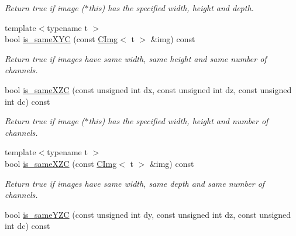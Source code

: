 \begin{DoxyCompactItemize}
\begin{DoxyCompactList}\small\item\em Return {\ttfamily true} if image ($\ast$this) has the specified width, height and depth. \item\end{DoxyCompactList}\item 
\hypertarget{structcimg__library_1_1CImg_a5468ee115db0e739ea554f5747e7ad16}{
{\footnotesize template$<$typename t $>$ }\\bool \hyperlink{structcimg__library_1_1CImg_a5468ee115db0e739ea554f5747e7ad16}{is\_\-sameXYC} (const \hyperlink{structcimg__library_1_1CImg}{CImg}$<$ t $>$ \&img) const }
\label{structcimg__library_1_1CImg_a5468ee115db0e739ea554f5747e7ad16}

\begin{DoxyCompactList}\small\item\em Return {\ttfamily true} if images have same width, same height and same number of channels. \item\end{DoxyCompactList}\item 
\hypertarget{structcimg__library_1_1CImg_afc24993d2887722e034d3362a6915b38}{
bool \hyperlink{structcimg__library_1_1CImg_afc24993d2887722e034d3362a6915b38}{is\_\-sameXZC} (const unsigned int dx, const unsigned int dz, const unsigned int dc) const }
\label{structcimg__library_1_1CImg_afc24993d2887722e034d3362a6915b38}

\begin{DoxyCompactList}\small\item\em Return {\ttfamily true} if image ($\ast$this) has the specified width, height and number of channels. \item\end{DoxyCompactList}\item 
\hypertarget{structcimg__library_1_1CImg_a802508f3fdc711cefb7511b518f71a57}{
{\footnotesize template$<$typename t $>$ }\\bool \hyperlink{structcimg__library_1_1CImg_a802508f3fdc711cefb7511b518f71a57}{is\_\-sameXZC} (const \hyperlink{structcimg__library_1_1CImg}{CImg}$<$ t $>$ \&img) const }
\label{structcimg__library_1_1CImg_a802508f3fdc711cefb7511b518f71a57}

\begin{DoxyCompactList}\small\item\em Return {\ttfamily true} if images have same width, same depth and same number of channels. \item\end{DoxyCompactList}\item 
\hypertarget{structcimg__library_1_1CImg_a8cb4cbc5b242844749db7b3095868302}{
bool \hyperlink{structcimg__library_1_1CImg_a8cb4cbc5b242844749db7b3095868302}{is\_\-sameYZC} (const unsigned int dy, const unsigned int dz, const unsigned int dc) const }
\label{structcimg__library_1_1CImg_a8cb4cbc5b242844749db7b3095868302}


\end{DoxyCompactItemize}
